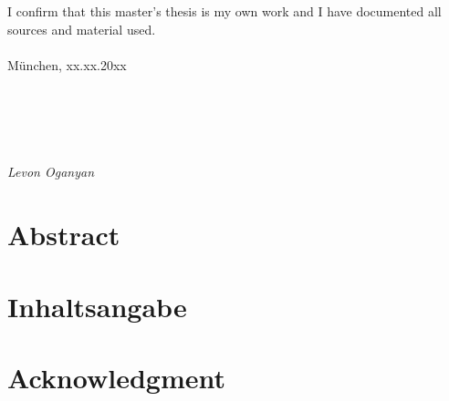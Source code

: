 \documentclass[12pt]{report}
\begin{document}
\newpage
\thispagestyle{empty}
\hoffset=0mm
\vspace*{\fill}
\noindent I confirm that this master's thesis is my own work and I have documented all sources and material used.\\\\
München, xx.xx.20xx\\\\\\\\\\\\
\noindent \textit{Levon Oganyan}

\newpage
\thispagestyle{empty}
\null

\newpage
\thispagestyle{empty}
\hoffset=0mm
\section*{Abstract}
\begin{spacing}{1.2}

\end{spacing}

\newpage
\thispagestyle{empty}
\hoffset=0mm
\section*{Inhaltsangabe}
\begin{spacing}{1.2}

\end{spacing}

\newpage
\thispagestyle{empty}
\hoffset=0mm
\section*{Acknowledgment}
\begin{spacing}{1.2}

\end{spacing}

\newpage
\setcounter{page}{1}
\hoffset=0mm
\fboxsep 0mm

\tableofcontents
\setcounter{tocdepth}{2}

\listoffigures
{}

\listoftables
{}

\printglossary[type=\acronymtype,style=long ,title=Abbreviations, toctitle=Abbreviations,nonumberlist]
\printglossary[type=symbolslist,style=long ,title=Symbols, nonumberlist]

\newpage
\setlength{\baselineskip}{3ex}
\begin{spacing}{1.15}







\end{spacing}

\newpage


\newpage


\end{document}
